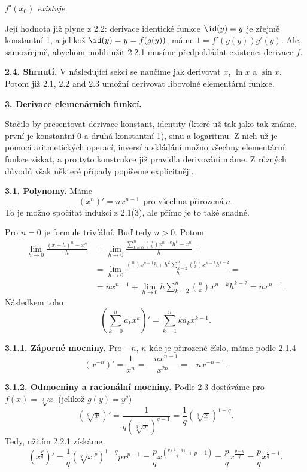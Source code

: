 \documentclass[12pt]{article}
\begin{document}
{\centerline {\em $f'(x_0)$ existuje.}

\smallskip

\noindent Její hodnota již plyne z 2.2: derivace identické funkce $\id(y)=y$ je zřejmě konstantní 1, a jelikož $\id(y)=y= f(g(y))$, máme
$1=f'(g(y))g'(y)$. Ale, samozřejmě, abychom mohli užít 2.2.1 musíme předpokládat existenci derivace $f$.

\bigskip

{\bf 2.4. Shrnutí.} V následující sekci se naučíme jak derivovat $x$, $\ln x$ a $\sin x$. Potom již 2.1, 2.2 and 2.3  
umožní derivovat libovolné elementární funkce. 


\vskip10mm
 
 {\large\bf 3. Derivace elemenárních funkcí.}
 
 \bigskip

Stačilo by presentovat derivace konstant, identity (které už tak jako tak známe, první je konstantní 0 a druhá konstantní 1), sinu a logaritmu. Z nich už je pomocí aritmetických operací, inversí a skládání možno  všechny elementární funkce získat, a pro tyto konstrukce již pravidla derivování máme. Z různých důvodů však některé případy popíšeme explicitněji.
 
 \bigskip
 
 {\bf 3.1. Polynomy.} Máme
 $$
 (x^n)' =nx^{n-1} \ \ \text{pro všechna přirozená}\ n.
 $$
 To je možno spočítat indukcí z 2.1(3), ale přímo je to také snadné.
 
 Pro $n=0$ je formule trivíální. Buď tedy $n>0$. Potom
 $$\begin{aligned}
 \lim_{h\to 0}\frac{(x+h)^n-x^n}{h}&=\lim_{h\to  0}\frac{\sum_{k=0}^n\binom{n}{k}x^{n-k}h^k-x^n}{h}=\\
 &=\lim_{h\to 0}\frac{\binom{n}{1}x^{n-1}h+h^2\sum_{k=2}^n\binom{n}{k}x^{n-k}h^{k-2}}{h}=\\
&= nx^{n-1}+\lim_{h\to 0}h\sum_{k=2}^n\binom{n}{k}x^{n-k}h^{k-2}=nx^{n-1}.
 \end{aligned}
 $$
 Následkem toho
 $$
 (\sum_{k=0}^na_kx^k)'=\sum_{k=1}^nka_kx^{k-1}.
 $$
 
 \medskip
 
 {\bf 3.1.1. Záporné mocniny.} Pro $-n$, $n$ kde je přirozené číslo, máme podle 2.1.4
 $$
 (x^{-n})'=\frac{1}{x^n}= \frac{-nx^{n-1}}{x^{2n}}= -nx^{-n-1}.
 $$
 
 \medskip
 
 {\bf 3.1.2. Odmocniny a racionální mocniny.} Podle 2.3 dostáváme pro $f(x)=\sqrt[q]x$
 (jelikož $g(y)=y^q$)
 $$
 (\sqrt[q]x)'=\frac{1}{q(\sqrt[q]x)^{q-1}}=\frac{1}{q}(\sqrt[q]x)^{1-q}.
 $$
 Tedy, užitím 2.2.1 získáme
 $$
 (x^\frac{p}{q})'=\frac{1}{q}(\sqrt[q]x^p)^{1-q}px^{p-1}=
 \frac{p}{q}x^{(\frac{p(1-q)}{q}+p-1)}=\frac{p}{q}x^\frac{p-q}{q}=
 \frac{p}{q}x^{\frac{p}{q}-1}.
 $$
 
}
\end{document}
